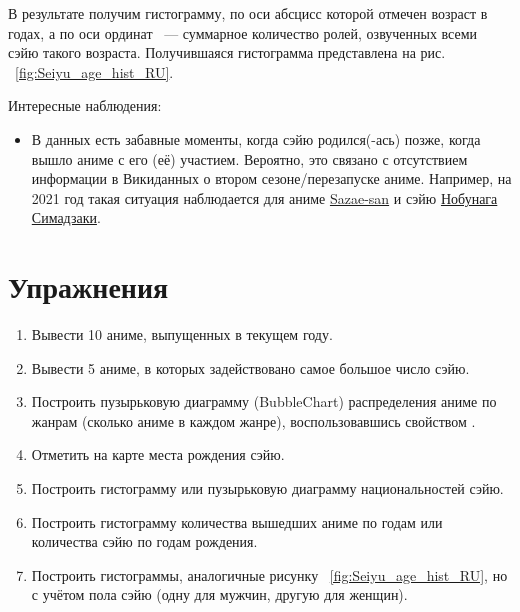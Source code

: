 В результате получим гистограмму, по оси абсцисс которой отмечен возраст в годах, а по оси ординат ~--- суммарное количество ролей, озвученных всеми сэйю такого возраста. Получившаяся гистограмма представлена на рис. ~\ref{fig:Seiyu_age_hist_RU}. 

\begin{figure*}[h]

    \setlength{\fboxsep}{0pt}%
    \setlength{\fboxrule}{1pt}%
	\caption[Гистограмма, которая отображает число аниме, озвученное сэйю разных возрастов, 2021.]{Гистограмма, которая показывает число аниме, озвученных различными сэйю, 2021. Гистограмма построена на основе данных, полученных с помощью запроса ~\protect\ref{lst:link_anime_seiyu}.}%
    \label{fig:Seiyu_age_hist_RU}%
\end{figure*} 

Интересные наблюдения:
\begin{itemize}
    \item В данных есть забавные моменты, когда сэйю родился(-ась) позже, когда вышло аниме с его (её) участием. Вероятно, это связано с отсутствием информации в Викиданных о втором сезоне/перезапуске аниме. Например, на 2021 год такая ситуация наблюдается для аниме \href{https://www.wikidata.org/wiki/Q11304591}{Sazae-san} и сэйю \href{https://www.wikidata.org/wiki/Q5968283}{Нобунага Симадзаки}.
\end{itemize}

\section{Упражнения}

\begin{enumerate}
    \item Вывести 10 аниме, выпущенных в текущем году.
    \item Вывести 5 аниме, в которых задействовано самое большое число сэйю.
    \item Построить пузырьковую диаграмму (BubbleChart) распределения аниме по жанрам (сколько аниме в каждом жанре), воспользовавшись свойством .
    \item Отметить на карте места рождения сэйю.
    \item Построить гистограмму или пузырьковую диаграмму национальностей сэйю.
    \item Построить гистограмму количества вышедших аниме по годам или количества сэйю по годам рождения.
    \item Построить гистограммы, аналогичные рисунку ~\ref{fig:Seiyu_age_hist_RU}, но с учётом пола сэйю (одну для мужчин, другую для женщин).
\end{enumerate}